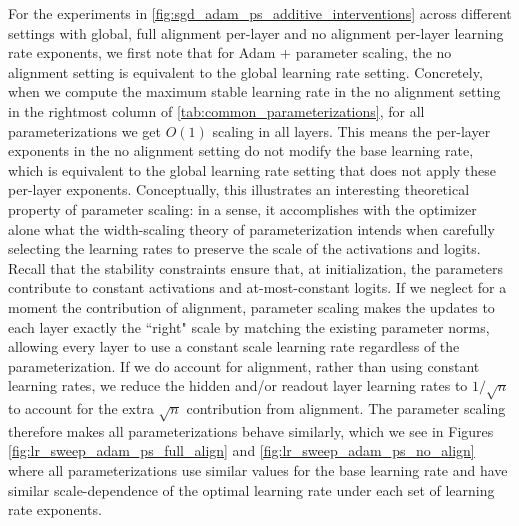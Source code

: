 \documentclass{article}
\theoremstyle{plain}
\theoremstyle{definition}
\theoremstyle{remark}
\begin{document}
For the experiments in \cref{fig:sgd_adam_ps_additive_interventions} across different settings with global, full alignment per-layer and no alignment per-layer learning rate exponents, we first note that for Adam + parameter scaling, the no alignment setting is equivalent to the global learning rate setting. Concretely, when we compute the maximum stable learning rate in the no alignment setting in the rightmost column of \cref{tab:common_parameterizations}, for all parameterizations we get $O(1)$ scaling in all layers. This means the per-layer exponents in the no alignment setting do not modify the base learning rate, which is equivalent to the global learning rate setting that does not apply these per-layer exponents. Conceptually, this illustrates an interesting theoretical property of parameter scaling: in a sense, it accomplishes with the optimizer alone what the width-scaling theory of parameterization intends when carefully selecting the learning rates to preserve the scale of the activations and logits. Recall that the stability constraints ensure that, at initialization, the parameters contribute to constant activations and at-most-constant logits. If we neglect for a moment the contribution of alignment, parameter scaling makes the updates to each layer exactly the ``right" scale by matching the existing parameter norms, allowing every layer to use a constant scale learning rate regardless of the parameterization. If we do account for alignment, rather than using constant learning rates, we reduce the hidden and/or readout layer learning rates to $1/\sqrt{n}$ to account for the extra $\sqrt{n}$ contribution from alignment. The parameter scaling therefore makes all parameterizations behave similarly, which we see in Figures \ref{fig:lr_sweep_adam_ps_full_align} and \ref{fig:lr_sweep_adam_ps_no_align} where all parameterizations use similar values for the base learning rate and have similar scale-dependence of the optimal learning rate under each set of learning rate exponents.
\end{document}
